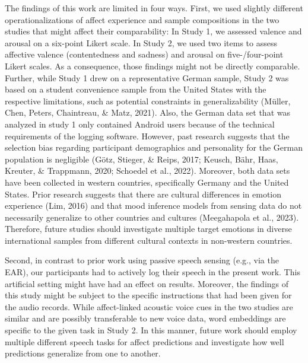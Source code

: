 \documentclass[
  english,
  man,floatsintext]{apa6}
\begin{document}
The findings of this work are limited in four ways. First, we used slightly different operationalizations of affect experience and sample compositions in the two studies that might affect their comparability: In Study 1, we assessed valence and arousal on a six-point Likert scale. In Study 2, we used two items to assess affective valence (contentedness and sadness) and arousal on five-/four-point Likert scales. As a consequence, those findings might not be directly comparable. Further, while Study 1 drew on a representative German sample, Study 2 was based on a student convenience sample from the United States with the respective limitations, such as potential constraints in generalizability (Müller, Chen, Peters, Chaintreau, \& Matz, 2021). Also, the German data set that was analyzed in study 1 only contained Android users because of the technical requirements of the logging software. However, past research suggests that the selection bias regarding participant demographics and personality for the German population is negligible (Götz, Stieger, \& Reips, 2017; Keusch, Bähr, Haas, Kreuter, \& Trappmann, 2020; Schoedel et al., 2022). Moreover, both data sets have been collected in western countries, specifically Germany and the United States. Prior research suggests that there are cultural differences in emotion experience (Lim, 2016) and that mood inference models from sensing data do not necessarily generalize to other countries and cultures (Meegahapola et al., 2023). Therefore, future studies should investigate multiple target emotions in diverse international samples from different cultural contexts in non-western countries.

Second, in contrast to prior work using passive speech sensing (e.g., via the EAR), our participants had to actively log their speech in the present work. This artificial setting might have had an effect on results. Moreover, the findings of this study might be subject to the specific instructions that had been given for the audio records. While affect-linked acoustic voice cues in the two studies are similar and are possibly transferable to new voice data, word embeddings are specific to the given task in Study 2. In this manner, future work should employ multiple different speech tasks for affect predictions and investigate how well predictions generalize from one to another.
\end{document}
